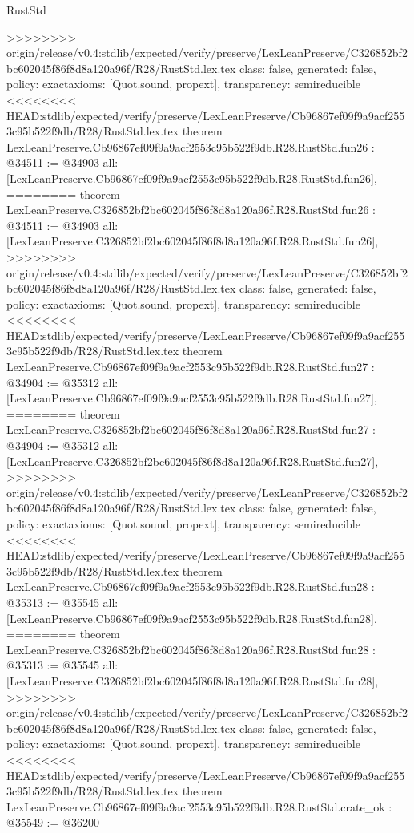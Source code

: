 \begin{lexlean}{RustStd}
\begin{coremodule}
{\begin{coremodule}
{{{{{{{{{{{{{{{{{{{{{{{{{{{{{>>>>>>>> origin/release/v0.4:stdlib/expected/verify/preserve/LexLeanPreserve/C326852bf2bc602045f86f8d8a120a96f/R28/RustStd.lex.tex
  class: false,
  generated: false,
  policy: exact{axioms: [Quot.sound, propext]},
  transparency: semireducible
}
<<<<<<<< HEAD:stdlib/expected/verify/preserve/LexLeanPreserve/Cb96867ef09f9a9acf2553c95b522f9db/R28/RustStd.lex.tex
theorem LexLeanPreserve.Cb96867ef09f9a9acf2553c95b522f9db.R28.RustStd.fun26 : @34511 := @34903 {
  all: [LexLeanPreserve.Cb96867ef09f9a9acf2553c95b522f9db.R28.RustStd.fun26],
========
theorem LexLeanPreserve.C326852bf2bc602045f86f8d8a120a96f.R28.RustStd.fun26 : @34511 := @34903 {
  all: [LexLeanPreserve.C326852bf2bc602045f86f8d8a120a96f.R28.RustStd.fun26],
>>>>>>>> origin/release/v0.4:stdlib/expected/verify/preserve/LexLeanPreserve/C326852bf2bc602045f86f8d8a120a96f/R28/RustStd.lex.tex
  class: false,
  generated: false,
  policy: exact{axioms: [Quot.sound, propext]},
  transparency: semireducible
}
<<<<<<<< HEAD:stdlib/expected/verify/preserve/LexLeanPreserve/Cb96867ef09f9a9acf2553c95b522f9db/R28/RustStd.lex.tex
theorem LexLeanPreserve.Cb96867ef09f9a9acf2553c95b522f9db.R28.RustStd.fun27 : @34904 := @35312 {
  all: [LexLeanPreserve.Cb96867ef09f9a9acf2553c95b522f9db.R28.RustStd.fun27],
========
theorem LexLeanPreserve.C326852bf2bc602045f86f8d8a120a96f.R28.RustStd.fun27 : @34904 := @35312 {
  all: [LexLeanPreserve.C326852bf2bc602045f86f8d8a120a96f.R28.RustStd.fun27],
>>>>>>>> origin/release/v0.4:stdlib/expected/verify/preserve/LexLeanPreserve/C326852bf2bc602045f86f8d8a120a96f/R28/RustStd.lex.tex
  class: false,
  generated: false,
  policy: exact{axioms: [Quot.sound, propext]},
  transparency: semireducible
}
<<<<<<<< HEAD:stdlib/expected/verify/preserve/LexLeanPreserve/Cb96867ef09f9a9acf2553c95b522f9db/R28/RustStd.lex.tex
theorem LexLeanPreserve.Cb96867ef09f9a9acf2553c95b522f9db.R28.RustStd.fun28 : @35313 := @35545 {
  all: [LexLeanPreserve.Cb96867ef09f9a9acf2553c95b522f9db.R28.RustStd.fun28],
========
theorem LexLeanPreserve.C326852bf2bc602045f86f8d8a120a96f.R28.RustStd.fun28 : @35313 := @35545 {
  all: [LexLeanPreserve.C326852bf2bc602045f86f8d8a120a96f.R28.RustStd.fun28],
>>>>>>>> origin/release/v0.4:stdlib/expected/verify/preserve/LexLeanPreserve/C326852bf2bc602045f86f8d8a120a96f/R28/RustStd.lex.tex
  class: false,
  generated: false,
  policy: exact{axioms: [Quot.sound, propext]},
  transparency: semireducible
}
<<<<<<<< HEAD:stdlib/expected/verify/preserve/LexLeanPreserve/Cb96867ef09f9a9acf2553c95b522f9db/R28/RustStd.lex.tex
theorem LexLeanPreserve.Cb96867ef09f9a9acf2553c95b522f9db.R28.RustStd.crate_ok : @35549 := @36200 {
}}}}}}}}}}}}}}}}}}}}}}}}}}}}}}}}
\end{coremodule}}
\end{coremodule}
\end{lexlean}
